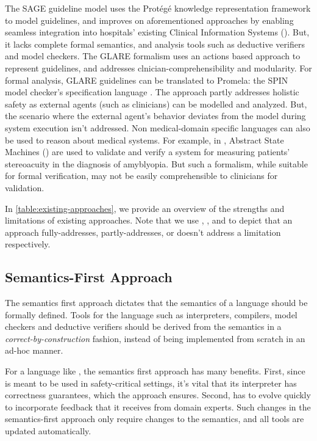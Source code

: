 The SAGE guideline model \cite{TuSAGE04} uses the Prot\'eg\'e knowledge
representation framework \cite{NoyAMIA03} to model guidelines,
and improves on aforementioned approaches by
enabling seamless integration into hospitals' existing Clinical Information Systems
(\CISs). But, it lacks complete formal semantics, and analysis tools
such as deductive verifiers and model checkers.
The GLARE formalism \cite{TerenzianiBook04} uses an actions based approach
to represent guidelines, and addresses clnician-comprehensibility and
modularity. For formal analysis, GLARE guidelines can be translated to
Promela: the SPIN model checker's specification language \cite{GiordanoAMIA06}.
The approach partly addresses holistic safety as
external agents (such as clinicians) can be modelled and analyzed.
But, the scenario where the external agent's behavior
deviates from the model during system execution isn't addressed.
Non medical-domain specific languages can also be used to reason about
medical systems. For example, in \cite{ArcainiMEMCODE15}, Abstract State
Machines (\ASMs) are used to validate and verify a system for measuring
patients' stereoacuity in the diagnosis of amyblyopia. But such a
formalism, while suitable for formal verification, may
not be easily comprehensible to clinicians for validation.

In \tablename{} \ref{table:existing-approaches}, we provide an overview of
the strengths and limitations of existing approaches. Note that we use
\greencheck{}, \cancelcheck{}, and \redcross{} to depict that an approach
fully-addresses, partly-addresses, or doesn't address a limitation respectively.


\subsection{Semantics-First Approach}

The semantics first approach dictates that the semantics
of a language should be formally defined. Tools for the language
such as interpreters, compilers, model checkers and deductive
verifiers should be derived from the semantics in a
\emph{correct-by-construction} fashion, instead of being implemented
from scratch in an ad-hoc manner.

For a language like \MediK{}, the semantics first approach has many benefits. First,
since \MediK{} is meant to be used in safety-critical settings,
it's vital that its interpreter has correctness guarantees, which
the approach ensures. Second, \MediK{} has to evolve quickly
to incorporate feedback that it receives from domain experts.
Such changes in the semantics-first approach only require changes to
the semantics, and all tools are updated automatically.
